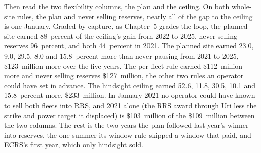 Then read the two flexibility columns, the plan and the ceiling. On both whole-site rules, the plan and never selling reserves, nearly all of the gap to the ceiling is one January. Graded by capture, as Chapter~5 grades the loop, the planned site earned 88~percent of the ceiling's gain from 2022 to 2025, never selling reserves 96~percent, and both 44~percent in 2021. The planned site earned 23.0, 9.0, 29.5, 8.0 and 15.8~percent more than never pausing from 2021 to 2025, \$123~million more over the five years. The per-fleet rule earned \$112~million more and never selling reserves \$127~million, the other two rules an operator could have set in advance. The hindsight ceiling earned 52.6, 11.8, 30.5, 10.1 and 15.8~percent more, \$233~million. In January 2021 no operator could have known to sell both fleets into RRS, and 2021 alone (the RRS award through Uri less the strike and power target it displaced) is \$103~million of the \$109~million between the two columns. The rest is the two years the plan followed last year's winner into reserves, the one summer its window rule skipped a window that paid, and ECRS's first year, which only hindsight sold. %
